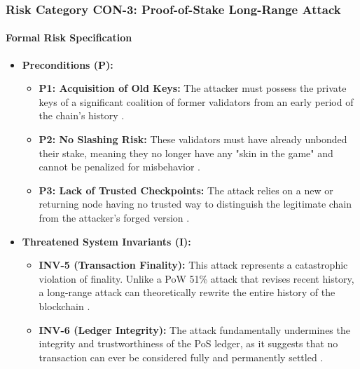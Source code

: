 \subsubsection{Risk Category CON-3: Proof-of-Stake Long-Range Attack}

\paragraph{Formal Risk Specification}

\begin{itemize}
    \item \textbf{Preconditions (P):}
    \begin{itemize}
        \item \textbf{P1: Acquisition of Old Keys:} The attacker must possess the private keys of a significant coalition of former validators from an early period of the chain's history \cite{wang2019}.
        \item \textbf{P2: No Slashing Risk:} These validators must have already unbonded their stake, meaning they no longer have any "skin in the game" and cannot be penalized for misbehavior \cite{wang2019}.
        \item \textbf{P3: Lack of Trusted Checkpoints:} The attack relies on a new or returning node having no trusted way to distinguish the legitimate chain from the attacker's forged version \cite{wang2019}.
    \end{itemize}

    \item \textbf{Threatened System Invariants (I):}
    \begin{itemize}
        \item \textbf{INV-5 (Transaction Finality):} This attack represents a catastrophic violation of finality. Unlike a PoW 51\% attack that revises recent history, a long-range attack can theoretically rewrite the entire history of the blockchain \cite{wang2019}.
        \item \textbf{INV-6 (Ledger Integrity):} The attack fundamentally undermines the integrity and trustworthiness of the PoS ledger, as it suggests that no transaction can ever be considered fully and permanently settled \cite{wang2019}.
    \end{itemize}


\end{itemize}
